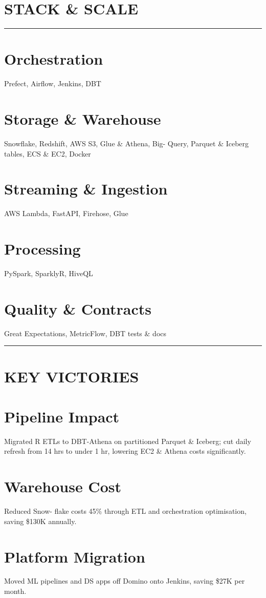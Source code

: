 %

\section{STACK \& SCALE}
\vspace{-0.1cm}%
\noindent\rule{\textwidth}{0.4pt}
\vspace{-0.1cm}%
%
\section{\large Orchestration}
{\color{purple} } Prefect, Airflow, Jenkins, DBT
~
\section{\large Storage \& Warehouse}
Snowflake, Redshift, AWS S3, Glue \& Athena, Big- Query, Parquet \& Iceberg tables, ECS \& EC2, Docker
~
\section{\large Streaming \& Ingestion}
AWS Lambda, FastAPI, Firehose, Glue
~
\section{\large Processing}
PySpark, SparklyR, HiveQL
~
\section{\large Quality \& Contracts}
Great Expectations, MetricFlow, DBT tests \& docs
%
\noindent\rule{\textwidth}{0.4pt}%
\vspace{-0.1cm}%
%
\section{KEY VICTORIES}
\vspace{-0.25cm}
%
\section{\large \faGem Pipeline Impact}
Migrated R ETLs to DBT-Athena on partitioned Parquet \& Iceberg; cut daily refresh from 14 hrs to under 1 hr, lowering EC2 \& Athena costs significantly.
%
\section{\large \faGem Warehouse Cost}
Reduced Snow- flake costs 45\% through ETL and orchestration optimisation, saving \$130K annually.
%
\section{\large \faGem Platform Migration}
Moved ML pipelines and DS apps off Domino onto Jenkins, saving \$27K per month.
